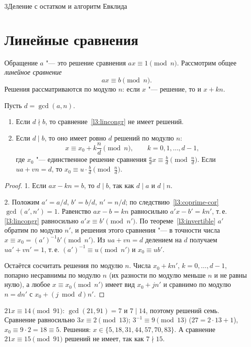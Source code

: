 \begin{lecture}{3}{Деление с остатком и алгоритм Евклида}
\section{Линейные сравнения}

Обращение $a$ "--- это решение сравнения $ax \equiv 1 \pmod n$. Рассмотрим общее \emph{линейное
сравнение}
\begin{equation}\label{l3:lincongr}
  ax \equiv b \pmod n.
\end{equation}
Решения рассматриваются по модулю $n$: если $x$ "--- решение, то и $x + kn$.

\begin{theorem}\label{l3:linear}
Пусть $d = \gcd(a, n)$.
\begin{enumerate}
  \item Если $d \nmid b$, то сравнение~\eqref{l3:lincongr} не имеет решений.
  \item Если $d \mid b$, то оно имеет ровно $d$ решений по модулю $n$:
    \[
      x \equiv x_0 + k\frac{n}{d} \pmod n, \qquad k = 0, 1, \dots, d - 1,
    \]
    где $x_0$ "--- единственное решение сравнения
    $\frac{a}{d} x \equiv \frac{b}{d} \pmod{\frac{n}{d}}$. Если $ua + vn = d$, то
    $x_0 \equiv u \cdot \frac{b}{d} \pmod{\frac{n}{d}}$.
\end{enumerate}
\end{theorem}

\begin{proof}
1. Если $ax - kn = b$, то $d \mid b$, так как $d \mid a$ и $d \mid n$.

2. Положим $a' = a/d$, $b' = b/d$, $n' = n/d$; по следствию~\ref{l3:coprime-cor} $\gcd(a', n') = 1$.
Равенство $ax - b = kn$ равносильно $a'x - b' = kn'$, т.\,е. \eqref{l3:lincongr} равносильно
$a'x \equiv b' \pmod{n'}$. По теореме~\ref{l3:invertible} $a'$ обратим по модулю $n'$, и решения
этого сравнения "--- в точности числа $x \equiv x_0 = (a')^{-1} b' \pmod{n'}$. Из $ua + vn = d$
делением на $d$ получаем $ua' + vn' = 1$, т.\,е. $(a')^{-1} \equiv u \pmod {n'}$ и
$x_0 \equiv u b'$.

Остаётся сосчитать решения по модулю $n$. Числа $x_0 + kn'$, $k = 0, \dots, d - 1$, попарно
несравнимы по модулю $n$ (их разности по модулю меньше $n$ и не равны нулю), а любое
$x \equiv x_0 \pmod{n'}$ имеет вид $x_0 + jn'$ и сравнимо по модулю $n = dn'$ с
$x_0 + (j \bmod d) n'$.
\end{proof}

\begin{example}
$21x \equiv 14 \pmod{91}$: $\gcd(21, 91) = 7$ и $7 \mid 14$, поэтому решений семь. Сравнение
равносильно $3x \equiv 2 \pmod{13}$; $3^{-1} \equiv 9 \pmod{13}$ ($27 = 2 \cdot 13 + 1$),
$x_0 \equiv 9 \cdot 2 = 18 \equiv 5$. Решения: $x \in \{5, 18, 31, 44, 57, 70, 83\}$. А сравнение
$21x \equiv 15 \pmod{91}$ решений не имеет, так как $7 \nmid 15$.
\end{example}


\end{lecture}
